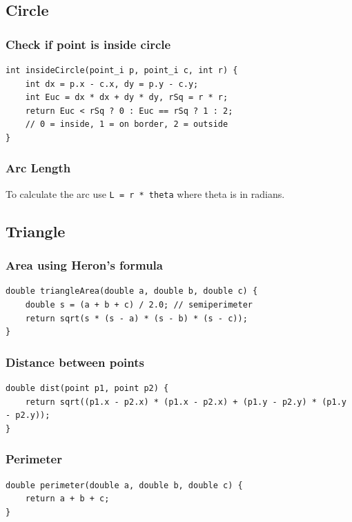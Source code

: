 \documentclass[10pt]{article}
\begin{document}
\begin{multicols*}{2}
\subsection{Circle}
\subsubsection{Check if point is inside circle}
\begin{lstlisting}[style=compactcpp]
int insideCircle(point_i p, point_i c, int r) {
    int dx = p.x - c.x, dy = p.y - c.y;
    int Euc = dx * dx + dy * dy, rSq = r * r;
    return Euc < rSq ? 0 : Euc == rSq ? 1 : 2;
    // 0 = inside, 1 = on border, 2 = outside
}
\end{lstlisting}

\subsubsection{Arc Length}
To calculate the arc use \texttt{L = r * theta} where theta is in radians.

\subsection{Triangle}
\subsubsection{Area using Heron's formula}
\begin{lstlisting}[style=compactcpp]
double triangleArea(double a, double b, double c) {
    double s = (a + b + c) / 2.0; // semiperimeter
    return sqrt(s * (s - a) * (s - b) * (s - c));
}
\end{lstlisting}

\subsubsection{Distance between points}
\begin{lstlisting}[style=compactcpp]
double dist(point p1, point p2) {
    return sqrt((p1.x - p2.x) * (p1.x - p2.x) + (p1.y - p2.y) * (p1.y - p2.y));
}
\end{lstlisting}

\subsubsection{Perimeter}
\begin{lstlisting}[style=compactcpp]
double perimeter(double a, double b, double c) {
    return a + b + c;
}


\end{lstlisting}
\end{multicols*}
\end{document}

